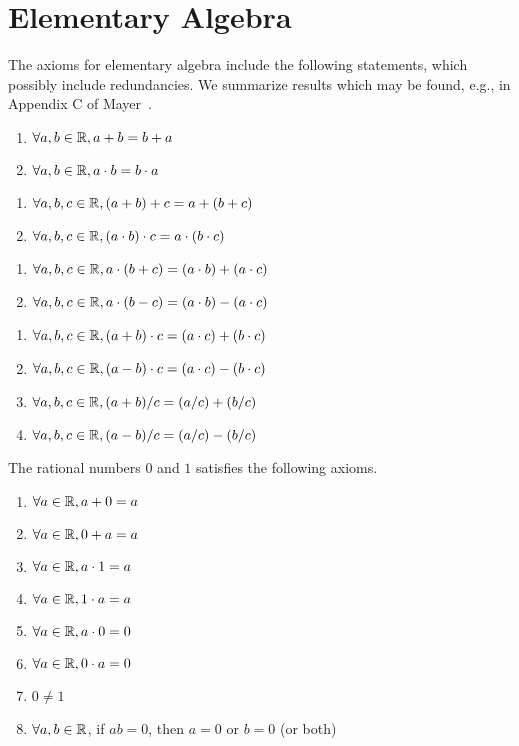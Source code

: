 \chapter{Elementary Algebra}

\M
The axioms for elementary algebra include the following statements,
which possibly include redundancies. We summarize results which may be
found, e.g., in Appendix C of Mayer~\cite{mayer:calculus}.

\begin{enumerate}
\item $\forall a,b\in\mathbb{R}, a+b=b+a$
\item $\forall a,b\in\mathbb{R}, a\cdot b=b\cdot a$
\end{enumerate}

\begin{enumerate}[resume*]
\item $\forall a,b,c\in\mathbb{R}, (a+b)+c=a+(b+c)$
\item $\forall a,b,c\in\mathbb{R}, (a\cdot b)\cdot c=a\cdot(b\cdot c)$
\end{enumerate}

\begin{enumerate}[resume*]
\item $\forall a,b,c\in\mathbb{R}, a\cdot(b+c)=(a\cdot b)+(a\cdot c)$
\item $\forall a,b,c\in\mathbb{R}, a\cdot(b-c)=(a\cdot b)-(a\cdot c)$
\end{enumerate}

\begin{enumerate}[resume*]
\item $\forall a,b,c\in\mathbb{R}, (a+b)\cdot c=(a\cdot c)+(b\cdot c)$
\item $\forall a,b,c\in\mathbb{R}, (a-b)\cdot c=(a\cdot c)-(b\cdot c)$
\item $\forall a,b,c\in\mathbb{R}, (a+b)/c=(a/c)+(b/c)$
\item  $\forall a,b,c\in\mathbb{R}, (a-b)/c=(a/c)-(b/c)$
\end{enumerate}

 The rational numbers $0$ and $1$ satisfies the
following axioms.

\begin{enumerate}[resume*]
\item $\forall a\in\mathbb{R}, a+0=a$
\item $\forall a\in\mathbb{R}, 0+a=a$
\item $\forall a\in\mathbb{R}, a\cdot1=a$
\item $\forall a\in\mathbb{R}, 1\cdot a=a$
\item $\forall a\in\mathbb{R}, a\cdot0=0$
\item $\forall a\in\mathbb{R}, 0\cdot a=0$
\item $0\neq1$
\item $\forall a,b\in\mathbb{R}$, if $ab=0$, then $a=0$ or $b=0$ (or both)
\end{enumerate}

